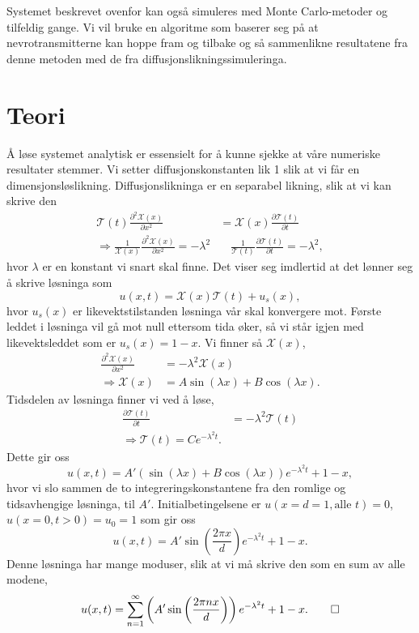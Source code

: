 \documentclass[norsk, 10pt]{article}
\def\para#1{\left( #1 \right)}
\begin{document}
Systemet beskrevet ovenfor kan også simuleres med Monte Carlo-metoder og tilfeldig gange. Vi vil bruke en algoritme som baserer seg på at nevrotransmitterne kan hoppe fram og tilbake og så sammenlikne resultatene fra denne metoden med de fra diffusjonslikningssimuleringa.

\section*{Teori}
Å løse systemet analytisk er essensielt for å kunne sjekke at våre numeriske resultater stemmer. Vi setter diffusjonskonstanten lik 1 slik at vi får en dimensjonsløslikning. Diffusjonslikninga er en separabel likning, slik at vi kan skrive den
\begin{align*}
\mathcal T(t) \frac{\partial^2\mathcal X(x)}{\partial x^2} &= \mathcal X(x) \frac{\partial \mathcal T(t)}{\partial t} \\
\Rightarrow \frac{1}{\mathcal X(x)} \frac{\partial^2\mathcal X(x)}{\partial x^2} = -\lambda^2 &\quad \frac{1}{\mathcal T(t)} \frac{\partial\mathcal T(t)}{\partial t} = -\lambda^2,
\end{align*}
hvor $\lambda$ er en konstant vi snart skal finne. Det viser seg imdlertid at det lønner seg å skrive løsninga som
$$ u(x,t) = \mathcal X(x)\mathcal T(t) + u_s(x), $$
hvor $u_s(x)$ er likevektstilstanden løsninga vår skal konvergere mot. Første leddet i løsninga vil gå mot null ettersom tida øker, så vi står igjen med likevektsleddet som er $u_s(x) = 1-x$. Vi finner så $\mathcal X(x)$,
\begin{align*}
 \frac{\partial^2\mathcal X(x)}{\partial x^2} &= -\lambda^2\mathcal X(x) \\
 \Rightarrow \mathcal X(x) &= A\sin(\lambda x) + B\cos(\lambda x).
\end{align*}
Tidsdelen av løsninga finner vi ved å løse,
\begin{align*}
 \frac{\partial\mathcal T(t)}{\partial t} &= -\lambda^2\mathcal T(t) \\
 \Rightarrow \mathcal T(t) = Ce^{-\lambda^2 t}.
\end{align*}
Dette gir oss
$$ u(x,t) = A'\para{\sin\para{\lambda x} + B\cos(\lambda x)}e^{-\lambda^2 t} + 1 - x, $$
hvor vi slo sammen de to integreringskonstantene fra den romlige og tidsavhengige løsninga, til $A'$. Initialbetingelsene er $u(x=d=1,\text{alle } t) = 0$, $u(x=0,t > 0) = u_0 = 1$ som gir oss
$$ u(x,t) = A'\sin\para{\frac{2\pi x}{d}}e^{-\lambda^2 t} + 1 - x. $$
Denne løsninga har mange moduser, slik at vi må skrive den som en sum av alle modene,
$$ u(x,t) = \sum\limits_{n=1}^{\infty}\para{A'\sin\para{\frac{2\pi nx}{d}}}e^{-\lambda^2 t} + 1 - x. \qed$$
\end{document}
